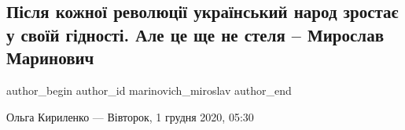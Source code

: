  
 
 
 
 
 
\subsection{Після кожної революції український народ зростає у своїй гідності. Але це ще не стеля – Мирослав Маринович}
\label{sec:01_12_2020.news.ua.pravda.marinovich_miroslav.1.revolution}
\ifcmt
	author_begin
   author_id marinovich_miroslav
	author_end
\fi

Ольга Кириленко — Вівторок, 1 грудня 2020, 05:30

